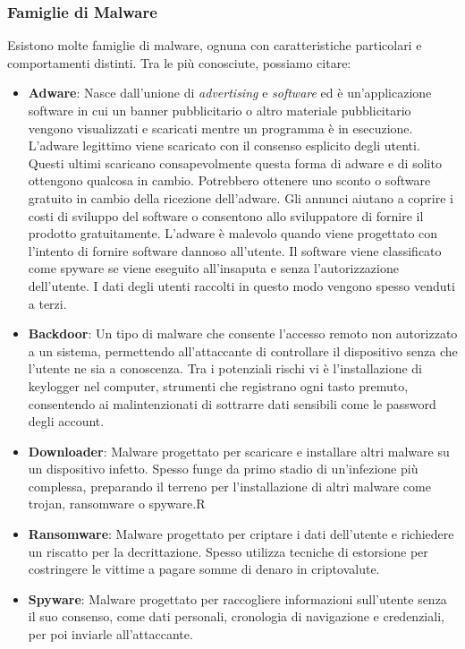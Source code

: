 \subsubsection{Famiglie di Malware}
Esistono molte famiglie di malware, ognuna con caratteristiche particolari e comportamenti distinti. Tra le più conosciute, possiamo citare:
\begin{itemize}
    \item \textbf{Adware}: Nasce dall'unione di \emph{advertising} e \emph{software} ed è un'applicazione software in cui un banner pubblicitario o altro materiale pubblicitario vengono visualizzati e scaricati mentre un programma è in esecuzione.
    L'adware legittimo viene scaricato con il consenso esplicito degli utenti. Questi ultimi scaricano consapevolmente questa forma di adware e di solito ottengono qualcosa in cambio. Potrebbero ottenere uno sconto o software gratuito in cambio della ricezione dell'adware. Gli annunci aiutano a coprire i costi di sviluppo del software o consentono allo sviluppatore di fornire il prodotto gratuitamente.
    L'adware è malevolo quando viene progettato con l'intento di fornire software dannoso all'utente. Il software viene classificato come spyware se viene eseguito all'insaputa e senza l'autorizzazione dell'utente. I dati degli utenti raccolti in questo modo vengono spesso venduti a terzi.
    \item \textbf{Backdoor}: Un tipo di malware che consente l'accesso remoto non autorizzato a un sistema, permettendo all'attaccante di controllare il dispositivo senza che l'utente ne sia a conoscenza. Tra i potenziali rischi vi è l'installazione di keylogger nel computer, strumenti che registrano ogni tasto premuto, consentendo ai malintenzionati di sottrarre dati sensibili come le password degli account.
    \item \textbf{Downloader}: Malware progettato per scaricare e installare altri malware su un dispositivo infetto. Spesso funge da primo stadio di un'infezione più complessa, preparando il terreno per l'installazione di altri malware come trojan, ransomware o spyware.R
    \item \textbf{Ransomware}: Malware progettato per criptare i dati dell'utente e richiedere un riscatto per la decrittazione. Spesso utilizza tecniche di estorsione per costringere le vittime a pagare somme di denaro in criptovalute.
    \item \textbf{Spyware}: Malware progettato per raccogliere informazioni sull'utente senza il suo consenso, come dati personali, cronologia di navigazione e credenziali, per poi inviarle all'attaccante.

\end{itemize}
